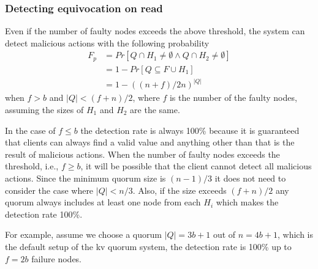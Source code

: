 \documentclass[twoside,twocolumn,10pt,fleqn]{article}
\begin{document}
\subsubsection*{Detecting equivocation on read}
Even if the number of faulty nodes exceeds the above threshold, the
system can detect malicious actions with the following probability
\begin{align*}
  F_p &= Pr[Q \cap H_1 \neq \emptyset \wedge Q \cap H_2 \neq
        \emptyset] \\
      & = 1 - Pr[Q \subseteq F \cup H_1] \\
      & = 1 - ((n + f) / 2n)^{|Q|}
\end{align*}
when $f > b$ and $|Q| < (f + n)/2$, where $f$ is the number of the
faulty nodes, assuming the sizes of $H_1$ and $H_2$ are the same.

In the case of $f \le b$ the detection rate is always 100\% because it is
guaranteed that clients can always find a valid value and anything
other than that is the result of malicious actions. When the number of
faulty nodes exceeds the threshold, i.e., $f \geq b$, it will be possible that
the client cannot detect all malicious actions. Since the minimum
quorum size is $(n-1)/3$ it does not need to consider the case where
$|Q| < n/3$. Also, if the size exceeds $(f+n)/2$ any quorum always
includes at least one node from each $H_i$ which makes the detection
rate 100\%. \\


For example, assume we choose a quorum $|Q| = 3b+1$ out of $n = 4b+1$,
which is the default setup of the kv quorum system, the detection rate
is 100\% up to $f = 2b$ failure nodes. \\

\end{document}
